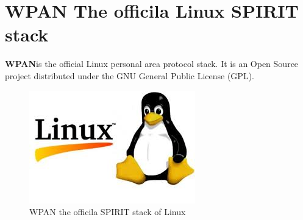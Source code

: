\section{WPAN The officila Linux SPIRIT stack}
\textbf{WPAN}is the official Linux personal area protocol stack. It is an Open Source project distributed under the GNU General Public License (GPL).
\begin{figure}[ht]
	\centering
	\includegraphics[scale=1]{images/linux.png}
	\caption{WPAN the officila SPIRIT stack of Linux}
\end{figure}
